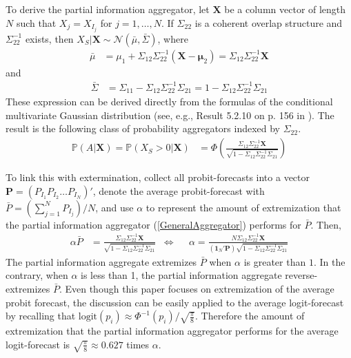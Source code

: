 \documentclass[11pt,twoside]{article}
\renewcommand{\P}{\mathbb{P}}
\theoremstyle{definition}
\theoremstyle{definition}
\begin{document}
To derive the partial information aggregator, let $\boldsymbol{X}$ be a column vector of length $N$ such that $X_j = X_{I_j}$ for $j = 1, \dots, N$. If $\Sigma_{22}$ is a coherent overlap structure and $\Sigma_{22}^{-1}$ exists, then $X_{S} | \boldsymbol{X} \sim \mathcal{N}(\bar{\mu}, \bar{\Sigma})$, where
\begin{align}
\bar{\mu} &= \mu_1 + \Sigma_{12} \Sigma_{22}^{-1} (\boldsymbol{X} - \boldsymbol{\mu}_2) =  \Sigma_{12} \Sigma_{22}^{-1} \boldsymbol{X} \label{condMu}
\end{align}
and
\begin{align}
 \bar{\Sigma}&= \Sigma_{11} - \Sigma_{12} \Sigma_{22}^{-1} \Sigma_{21} =1 - \Sigma_{12} \Sigma_{22}^{-1} \Sigma_{21}  \label{condSigma}
\end{align}
These expression can be derived directly from the formulas of the conditional multivariate Gaussian distribution (see, e.g., Result 5.2.10 on p. 156 in \cite{ravishanker2001first}). The result is the following class of probability aggregators indexed by $\Sigma_{22}$.
\begin{align}
\P\left(A  | \boldsymbol{X}\right)  = \P\left(X_{S} > 0 | \boldsymbol{X}\right) &= \Phi\left( \frac{\Sigma_{12} \Sigma_{22}^{-1} \boldsymbol{X}}{\sqrt{1 - \Sigma_{12} \Sigma_{22}^{-1} \Sigma_{21}}}\right) \label{GeneralAggregator}
\end{align}

To link this with extermination, collect all probit-forecasts into a vector $\boldsymbol{P} = (P_{I_1} P_{I_2} \dots P_{I_N})'$, denote the average probit-forecast with $\bar{P} = \left( \sum_{j=1}^N P_{I_j} \right)/N$, and use $\alpha$ to represent the amount of extremization that the partial information aggregator (\ref{GeneralAggregator}) performs for $\bar{P}$. Then,
\begin{align}
\alpha \bar{P}&=  \frac{\Sigma_{12} \Sigma_{22}^{-1} \boldsymbol{X}}{\sqrt{1 - \Sigma_{12} \Sigma_{22}^{-1} \Sigma_{21}}}  &\Leftrightarrow&& \alpha  = \frac{N \Sigma_{12} \Sigma_{22}^{-1} \boldsymbol{X}}{\left(\boldsymbol{1}_N' \boldsymbol{P} \right) \sqrt{1 - \Sigma_{12} \Sigma_{22}^{-1} \Sigma_{21}}} \label{alpha}
\end{align}
The partial information aggregate extremizes $\bar{P}$ when $\alpha$ is greater than $1$. In the contrary, when $\alpha$ is less than 1, the partial information aggregate reverse-extremizes $\bar{P}$. Even though this paper focuses on extremization of the average probit forecast, the discussion can be easily applied to the average logit-forecast by recalling that $\text{logit}(p_i) \approx \Phi^{-1}(p_i)/\sqrt{\frac{\pi}{8}}$. Therefore the amount of extremization that the partial information aggregator performs for the average logit-forecast is $\sqrt{\frac{\pi}{8}} \approx 0.627$ times $\alpha$.  
\end{document}
